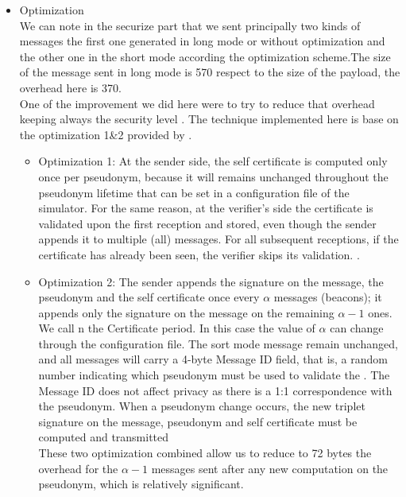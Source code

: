 \begin{itemize}
\item Optimization\\

We can note in the securize part  that we sent principally two kinds of messages the first one generated in long mode or without optimization and the other one in the short mode according the optimization scheme.The size of the message sent in long mode is 570 respect to the size of the payload, the overhead here is 370.\\
 One of the improvement we did here were to try to reduce that overhead keeping always the security level . The technique implemented  here is base on the  optimization 1\&2 provided by \cite{calandriello}. \\
 \begin{itemize}
 \item Optimization 1: At the sender side, the self certificate  is computed only once per pseudonym, because it will remains unchanged throughout the pseudonym lifetime that can be set in a configuration file of the simulator. For the same reason, at the verifier's side the certificate is validated upon the first reception and stored, even though the sender appends it to multiple (all) messages. For all subsequent receptions, if the certificate has already been seen, the verifier skips its validation.
 .\\
 \item Optimization 2: The sender appends  the signature on the message, the pseudonym and the self certificate once  every $\alpha$ messages (beacons); it appends only the signature on the message  on the remaining $\alpha-1$ ones. We call n the Certificate period. In this case the value of $\alpha$ can change through the configuration file. The sort mode message remain  unchanged, and all messages will carry a 4-byte Message ID field, that is, a random number indicating which pseudonym must be used to validate the . The Message ID does not affect privacy as there is a 1:1 correspondence with the pseudonym. When a pseudonym change occurs, the new triplet signature on the message, pseudonym and self certificate  must be computed and transmitted\\
  These two optimization combined allow us to reduce to 72 bytes the overhead for the $\alpha-1$ messages sent after any new computation on the pseudonym, which is relatively significant.
\end{itemize}
\end{itemize}


